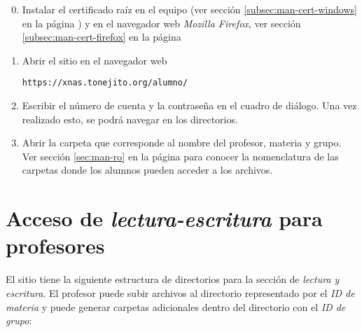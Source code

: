 {
\linespread{1}
\begin{enumerate}
\setcounter{enumi}{-1} %

  \item Instalar el certificado ra\'{i}z en el equipo (ver secci\'{o}n \ref{subsec:man-cert-windows} en la p\'{a}gina \pageref{subsec:man-cert-windows}) y en el navegador web \textsl{Mozilla Firefox}, ver secci\'{o}n \ref{subsec:man-cert-firefox} en la p\'{a}gina \pageref{subsec:man-cert-firefox}

  \item Abrir el sitio en el navegador web

    \texttt{https://xnas.tonejito.org/alumno/}


  \item Escribir el n\'{u}mero de cuenta y la contrase\~{n}a en el cuadro de di\'{a}logo. Una vez realizado esto, se podr\'{a} navegar en los directorios.


  \item Abrir la carpeta que corresponde al nombre del profesor, materia y grupo. Ver secci\'{o}n \ref{sec:man-ro} en la p\'{a}gina \pageref{sec:man-ro} para conocer la nomenclatura de las carpetas donde los alumnos pueden acceder a los archivos.

\end{enumerate}
}

\newpage
    \section {Acceso de \textsl{lectura-escritura} para profesores}
    \label{sec:man-rw}


El sitio tiene la siguiente estructura de directorios para la secci\'{o}n de \textit{lectura y escritura}. El profesor puede subir archivos al directorio representado por el \emph{ID de materia} y puede generar carpetas adicionales dentro del directorio con el \emph{ID de grupo}:

